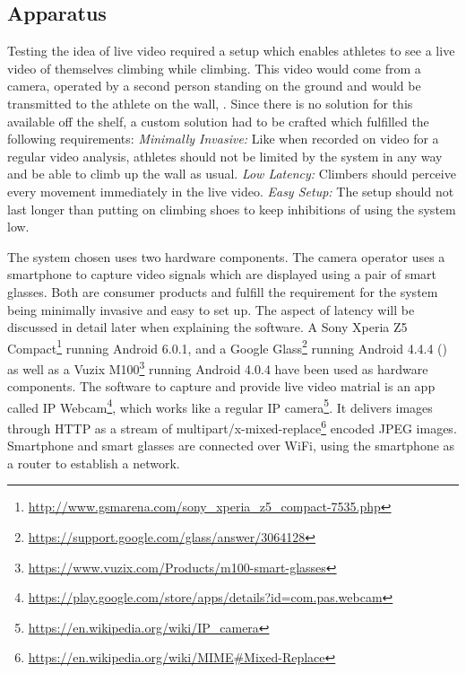 \subsection{Apparatus}

Testing the idea of live video required a setup which enables athletes to see a live video of themselves climbing while climbing. This video would come from a camera, operated by a second person standing on the ground and would be transmitted to the athlete on the wall, \cf {}. Since there is no solution for this available off the shelf, a custom solution had to be crafted which fulfilled the following requirements: \textit{Minimally Invasive:} Like when recorded on video for a regular video analysis, athletes should not be limited by the system in any way and be able to climb up the wall as usual. \textit{Low Latency:} Climbers should  perceive every movement immediately in the live video. \textit{Easy Setup:} The setup should not last longer than putting on climbing shoes to keep inhibitions of using the system low.



The system chosen uses two hardware components. The camera operator uses a smartphone to capture video signals which are displayed using a pair of smart glasses. Both are consumer products and fulfill the requirement for the system being minimally invasive and easy to set up. The aspect of latency will be discussed in detail later when explaining the software. A Sony Xperia Z5 Compact\footnote{\url{http://www.gsmarena.com/sony_xperia_z5_compact-7535.php}} running Android 6.0.1, and a Google Glass\footnote{\url{https://support.google.com/glass/answer/3064128}} running Android 4.4.4 () as well as a Vuzix M100\footnote{\url{https://www.vuzix.com/Products/m100-smart-glasses}} running Android 4.0.4 have been used as hardware components. The software to capture and provide live video matrial is an app called IP Webcam\footnote{\url{https://play.google.com/store/apps/details?id=com.pas.webcam}}, which works like a regular IP camera\footnote{\url{https://en.wikipedia.org/wiki/IP_camera}}. It delivers images through HTTP as a stream of multipart/x-mixed-replace\footnote{\url{https://en.wikipedia.org/wiki/MIME\#Mixed-Replace}} encoded JPEG images. Smartphone and smart glasses are connected over WiFi, using the smartphone as a router to establish a network.

